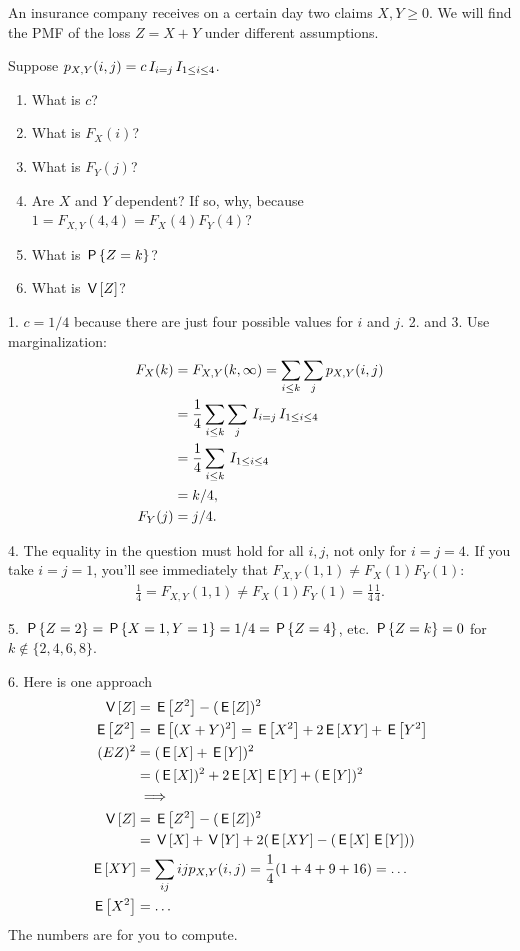 \begin{exercise}
An insurance company receives on a certain day two claims $X, Y \geq 0$.
We will find the PMF of the loss $Z=X+Y$ under different assumptions.

Suppose $p_{X,Y}(i,j) = c \1{i=j}\1{1\leq i \leq 4}$.
\begin{enumerate}
\item  What is $c$?
\item What is $F_{X}(i)$?
\item What is $F_{Y}(j)$?
\item  Are $X$ and $Y$ dependent?  If so, why, because $1=F_{X,Y}(4,4)= F_X(4)F_Y(4)$?
\item What is $\P{Z=k}$?
\item What is $\V Z$?
\end{enumerate}


\begin{solution}
1. $c=1/4$ because there are just four possible values for $i$ and $j$.
2. and 3. Use marginalization:
\begin{align}
F_X(k) &=  F_{X,Y}(k, \infty ) = \sum_{i\leq k} \sum_j p_{X,Y}(i,j) \\
 &= \frac{1}{4}\sum_{i\leq k} \sum_j \1{i=j}\1{1\leq i \leq 4}\\
 &= \frac{1}{4}\sum_{i\leq k} \1{1\leq i \leq 4} \\
&=k/4,\\
F_Y(j) &= j/4.
\end{align}

4.  The equality in the question must hold for all $i,j$, not only for $i=j=4$.
  If you take $i=j=1$, you'll see immediately that $F_{X,Y}(1,1)\neq F_X(1)F_Y(1)$:
  \begin{align}
    \label{eq:823}
    \frac{1}{4} = F_{X,Y}(1,1) \neq F_{X}(1) F_Y(1) = \frac{1}{4}\frac{1}{4}.
  \end{align}

5. $\P{Z=2} = \P{X=1, Y=1} = 1/4 = \P{Z=4}$, etc.
$\P{Z=k} = 0$ for $k\not \in \{2, 4, 6, 8\}$.

6.
Here is one approach
\begin{align}
\label{eq:83}
\V Z &= \E{Z^2} - (\E Z)^{2}\\
\E{Z^2} &= \E{(X+Y)^{2}} = \E{X^{2}} + 2\E{XY} + \E{Y^{2}} \\
(E{Z})^{2} &= (\E X + \E Y)^{2} \\
 &= (\E X)^2 + 2\E X \E Y + (\E Y)^{2} \\
&\implies \\
\V Z &= \E{Z^2} - (\E Z)^{2}\\
 &= \V X + \V Y + 2 (\E{XY} - (\E X \E Y))\\
\E{XY} &= \sum_{ij} i j p_{X,Y}(i,j) = \frac 1 4 (1 + 4 + 9 + 16) = \ldots \\
\E{X^{2}} &= \ldots
\end{align}
The numbers are for you to compute.
\end{solution}
\end{exercise}



